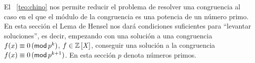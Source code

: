 \theoremstyle{plain}
\newtheorem{teoHensel}{\teoname}[section]

\theoremstyle{definition}
\newtheorem{defHensel}[teoHensel]{}
\newtheorem{obsHensel}[teoHensel]{\obsname}
\newtheorem{ejemHensel}[teoHensel]{\ejemname}


El \teoname~\ref{teo:chino} nos permite reducir el
problema de resolver una congruencia al caso en el
que el m\'odulo de la congruencia es una potencia de
un n\'umero primo. En esta secci\'on el Lema de Hensel
nos dar\'a condiciones suficientes para ``levantar
soluciones'', es decir, empezando con una soluci\'on
a una congruencia $f(x)\equiv 0\tmodulo[p^k]$,
$f\in\polinomios\Enteros$, conseguir una soluci\'on a
la congruencia $f(x)\equiv 0\tmodulo[p^{k+1}]$.
En esta secci\'on $p$ denota n\'umeros primos.

